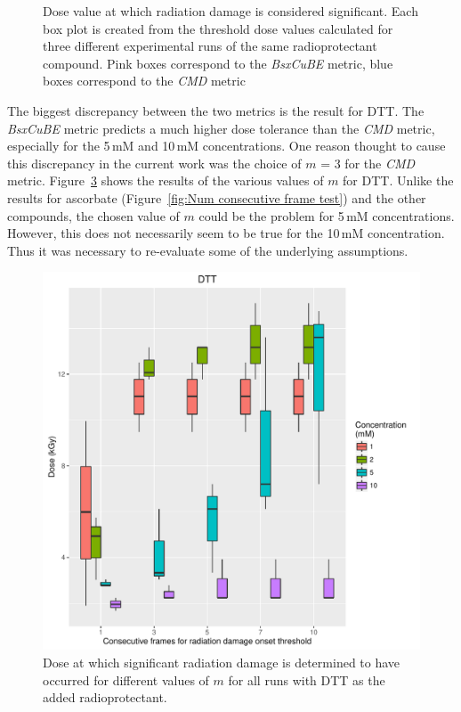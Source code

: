 \begin{figure}
\begin{subfigure}[b]{0.45\textwidth}
            \caption{}
            \label{fig:SAXS Metric comparison - 10mM}
    \end{subfigure}
    \caption[Radioprotectant efficacy comparison  boxplots for each concentration in the experiment.]{Dose value at which radiation damage is considered significant. Each box plot is created from the threshold dose values calculated for three different experimental runs of the same radioprotectant compound. Pink boxes correspond to the \textit{BsxCuBE} metric, blue boxes correspond to the \textit{CMD} metric}
    \label{fig:SAXS Metric comparison}
\end{figure}

The biggest discrepancy between the two metrics is the result for DTT.
The \textit{BsxCuBE} metric predicts a much higher dose tolerance than the \textit{CMD} metric, especially for the 5$\,$mM and 10$\,$mM concentrations.
One reason thought to cause this discrepancy in the current work was the choice of $m$ = 3 for the \textit{CMD} metric.
Figure~\ref{fig:Num consec frames - DTT} shows the results of the various values of $m$ for DTT.
Unlike the results for ascorbate (Figure~\ref{fig:Num consecutive frame test}) and the other compounds, the chosen value of $m$ could be the problem for 5$\,$mM concentrations.
However, this does not necessarily seem to be true for the 10$\,$mM concentration.
Thus it was necessary to re-evaluate some of the underlying assumptions.
\begin{figure}
    \centering
    \includegraphics[width=1.0\textwidth]{figures/saxs/DTT_Num_consec_fr_comp.pdf}
    \caption{Dose at which significant radiation damage is determined to have occurred for different values of $m$ for all runs with DTT as the added radioprotectant.}
    \label{fig:Num consec frames - DTT}
\end{figure}


